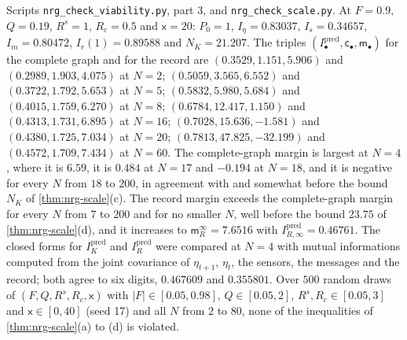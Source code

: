 \begin{numcheck}\label{chk:nrg-scale}
Scripts \texttt{nrg\_\allowbreak check\_\allowbreak viability.py}, part 3, and \texttt{nrg\_\allowbreak check\_\allowbreak scale.py}. At $F=0.9$, $Q=0.19$, $R^s=1$, $R_c=0.5$ and $\mathsf x=20$: $P_0=1$, $I_\eta=0.83037$, $I_s=0.34657$, $I_m=0.80472$, $I_r(1)=0.89588$ and $N_K=21.207$. The triples $(I^{\mathrm{pred}}_\bullet,\mathsf c_\bullet,\mathsf m_\bullet)$ for the complete graph and for the record are $(0.3529,\allowbreak1.151,\allowbreak5.906)$ and $(0.2989,\allowbreak1.903,\allowbreak4.075)$ at $N=2$; $(0.5059,\allowbreak3.565,\allowbreak6.552)$ and $(0.3722,\allowbreak1.792,\allowbreak5.653)$ at $N=5$; $(0.5832,\allowbreak5.980,\allowbreak5.684)$ and $(0.4015,\allowbreak1.759,\allowbreak6.270)$ at $N=8$; $(0.6784,\allowbreak12.417,\allowbreak1.150)$ and $(0.4313,\allowbreak1.731,\allowbreak6.895)$ at $N=16$; $(0.7028,\allowbreak15.636,\allowbreak-1.581)$ and $(0.4380,\allowbreak1.725,\allowbreak7.034)$ at $N=20$; $(0.7813,\allowbreak47.825,\allowbreak-32.199)$ and $(0.4572,\allowbreak1.709,\allowbreak7.434)$ at $N=60$. The complete-graph margin is largest at $N=4$, where it is $6.59$, it is $0.484$ at $N=17$ and $-0.194$ at $N=18$, and it is negative for every $N$ from $18$ to $200$, in agreement with and somewhat before the bound $N_K$ of \cref{thm:nrg-scale}(c). The record margin exceeds the complete-graph margin for every $N$ from $7$ to $200$ and for no smaller $N$, well before the bound $23.75$ of \cref{thm:nrg-scale}(d), and it increases to $\mathsf m_R^\infty=7.6516$ with $I^{\mathrm{pred}}_{R,\infty}=0.46761$. The closed forms for $I^{\mathrm{pred}}_K$ and $I^{\mathrm{pred}}_R$ were compared at $N=4$ with mutual informations computed from the joint covariance of $\eta_{t+1}$, $\eta_t$, the sensors, the messages and the record; both agree to six digits, $0.467609$ and $0.355801$. Over $500$ random draws of $(F,Q,R^s,R_c,\mathsf x)$ with $\vert F\vert\in[0.05,0.98]$, $Q\in[0.05,2]$, $R^s,R_c\in[0.05,3]$ and $\mathsf x\in[0,40]$ (seed 17) and all $N$ from $2$ to $80$, none of the inequalities of \cref{thm:nrg-scale}(a) to (d) is violated.
\end{numcheck}

